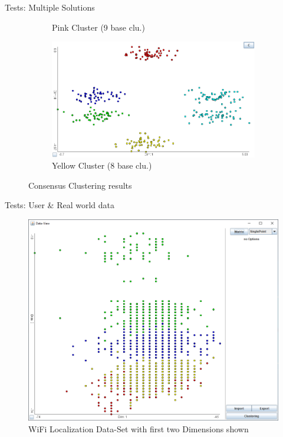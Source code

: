 \documentclass[aspectratio=169]{beamer}
\begin{document}
\begin{frame}{Tests: Multiple Solutions}
\begin{figure}[h]
\begin{subfigure}[t]{.35\textwidth}
		  \caption{Pink Cluster (9 base clu.)}
		  \label{fig:multi_c4}
	\end{subfigure}
	\begin{subfigure}[t]{.35\textwidth}
		  \centering
		  \includegraphics[width=.99\linewidth]{multi_c5_1}
		  \caption{Yellow Cluster (8 base clu.)}
		  \label{fig:multi_c5_1}
	\end{subfigure}
	
	\caption{Consensus Clustering results}
	\label{fig:multi_consres}
	\end{figure}
\end{frame}

\begin{frame}{Tests: User \& Real world data}
	\begin{figure}[h]
		\centering
		\includegraphics[width=.64\textwidth]{user_wifi_gt}
		\caption{WiFi Localization Data-Set with first two Dimensions shown}
		\label{fig:user_wifi_gt}
	\end{figure}
\end{frame}
\end{document}
